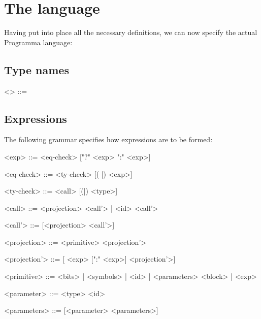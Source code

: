 \chapter{The language} \label{chp:language}

Having put into place all the necessary definitions, we can now specify the actual Programma language:

\section{Type names} \label{sec:type_names}

\begin{bnf}

  <> ::= 

\end{bnf}


\section{Expressions} \label{sec:expressions}

The following grammar specifies how expressions are to be formed:

\begin{bnf}

  <exp>   ::= <eq-check> ["?" <exp> ":" <exp>]
  
  <eq-check>  ::= <ty-check> [( |) <exp>]
  
  <ty-check>  ::= <call> [(|) <type>]
  
  <call>  ::= <projection> <call'>  |  <id> <call'>
  
  <call'> ::= [<projection> <call'>]
  
  <projection>  ::= <primitive> <projection'>

  <projection'> ::= [\lit{[} <exp> [":" <exp>] \lit{]} <projection'>]

  <primitive> ::= <bits> | <symbols> | <id> |  <parameters> <block> | \lit{(} <exp> \lit{)}
  
  <parameter> ::= <type> <id>

  <parameters> ::= [<parameter> <parameters>]

\end{bnf}

